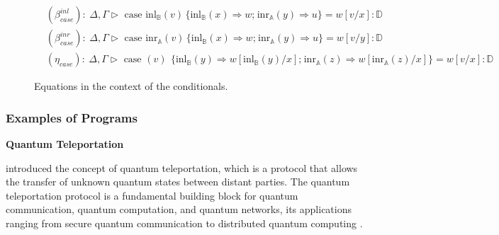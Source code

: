 \documentclass[10pt,a4paper]{amsart}
\theoremstyle{definition}
\theoremstyle{definition}
\theoremstyle{definition}
\theoremstyle{definition}
\theoremstyle{definition}
\theoremstyle{definition}
\begin{document}
  \begin{figure}[h!]
    \centering
    \begin{tcolorbox}[colframe=black, colback=white, boxrule=0.6pt, arc=1pt,boxsep=1pt,top=1pt,bottom=1pt, width=0.85 \textwidth]
    \begin{equation*}
        \begin{split}
          &(\beta_{case}^{inl}): \hspace{3pt} \Delta,\Gamma \triangleright \text{ case } \text{inl}_{\mathbb{B}}(v) \hspace{2pt} \{\text{inl}_{\mathbb{B}} (x) \Rightarrow w ; \hspace{1pt} \text{inr}_{\mathbb{A}} (y) \Rightarrow u\}= w[v/x] : \mathbb{D} \\
          &(\beta_{case}^{inr}): \hspace{3pt} \Delta,\Gamma  \triangleright  \text{ case } \text{inr}_{\mathbb{A}}(v) \hspace{2pt} \{\text{inl}_{\mathbb{B}} (x) \Rightarrow w ; \hspace{1pt} \text{inr}_{\mathbb{A}} (y) \Rightarrow u\} = w[v/y] : \mathbb{D} \\
          & (\eta_{case}): \hspace{3pt} \Delta,\Gamma  \triangleright  \text{ case }(v)\ \hspace{2pt} \{\text{inl}_{\mathbb{B}} (y) \Rightarrow w [ \text{inl}_{\mathbb{B}}(y)/x] ; \hspace{1pt} \text{inr}_{\mathbb{A}} (z) \Rightarrow w [ \text{inr}_{\mathbb{A}}(z)/x]\} = w[v/x] : \mathbb{D}
        \end{split}
    \end{equation*}
    \end{tcolorbox}
    \caption{Equations in the context of the conditionals.}
    \label{fig:equations-in-context-cond}
    \end{figure}

    \subsubsection{Examples of Programs}

    \par\vspace{10pt}  
    \textbf{ Quantum Teleportation}


    \cite{bennett1993teleporting} introduced the concept of quantum teleportation, which is a protocol that allows the transfer of   unknown quantum states between distant parties.  The quantum teleportation protocol is a fundamental building block for quantum communication, quantum computation, and quantum networks, its applications ranging
from secure quantum communication to distributed quantum computing \cite{briegel1998quantum,gottesman1999demonstrating,kimble2008quantum}.
\end{document}
